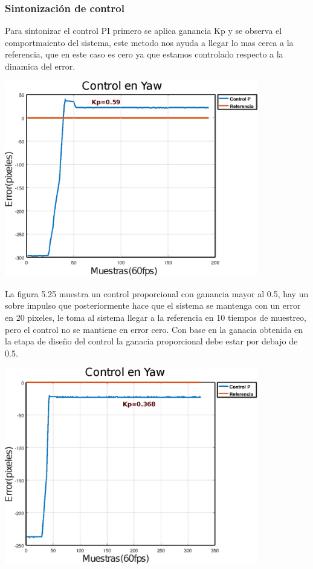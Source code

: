 \subsubsection{Sintonización de control}
Para sintonizar el control PI primero se aplica ganancia Kp y se observa el comportmaiento del sistema, este
metodo nos ayuda a llegar lo mas cerca a la referencia, que en este caso es cero ya que estamos controlado
respecto a la dinamica del error. 
\begin{center}
	\includegraphics[width=0.83\textwidth]{Contenido/Cuerpo/Capitulo5/Fig30.eps}
	\label{Fig4}
\end{center}
La figura 5.25 muestra un control proporcional con ganancia mayor al 0.5, hay un sobre impulso que posteriormente 
hace que el sistema se mantenga con un error en 20 pixeles, le toma al sistema llegar a la referencia en 10 tiempos de 
muestreo, pero el control no se mantiene en error cero. Con base en la ganacia obtenida en la etapa de diseño del control la ganacia proporcional debe estar por debajo de 0.5.
\begin{center}
	\includegraphics[width=0.83\textwidth]{Contenido/Cuerpo/Capitulo5/Fig31.eps}
	\label{Fig4}
\end{center}
